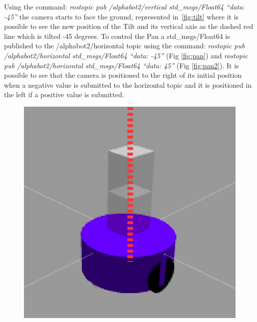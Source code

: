 \documentclass[conference]{IEEEtran}
\begin{document}
Using the command: \textit{rostopic pub /alphabot2/vertical std\_msgs/Float64 ``data: -45''} the camera starts to face the ground, represented in~\cref{fig:tilt} where it is possible to see the new position of the Tilt and its vertical axis as the dashed red line which is tilted -45 degrees. To control the Pan a std\_msgs/Float64 is published to the /alphabot2/horizontal topic using the command: \textit{rostopic pub /alphabot2/horizontal std\_msgs/Float64 ``data: -45''} (Fig \ref{fig:pan}) and \textit{rostopic pub /alphabot2/horizontal std\_msgs/Float64 ``data: 45''} (Fig \ref{fig:pan2}). It is possible to see that the camera is positioned to the right of its initial position when a negative value is submitted to the horizontal topic and it is positioned in the left if a positive value is submitted.
\begin{figure}[H]
\centering
\begin{minipage}{.45\linewidth}
  \centering
  \includegraphics[width=\linewidth]{0.png}
  \label{fig:alphaBot2_0}
\end{minipage}\quad
\begin{minipage}{.45\linewidth}
  \centering

\end{minipage}
\end{figure}
\end{document}
